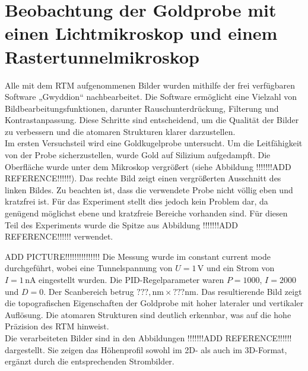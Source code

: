 \chapter{Beobachtung der Goldprobe mit einen Lichtmikroskop und einem Rastertunnelmikroskop}
Alle mit dem RTM aufgenommenen Bilder wurden mithilfe der frei verfügbaren Software „Gwyddion“ nachbearbeitet.
Die Software ermöglicht eine Vielzahl von Bildbearbeitungsfunktionen, darunter Rauschunterdrückung, Filterung und Kontrastanpassung. Diese Schritte sind entscheidend, um die Qualität der Bilder zu verbessern und die atomaren Strukturen klarer darzustellen.\\
Im ersten Versuchsteil wird eine Goldkugelprobe untersucht. Um die Leitfähigkeit von der Probe sicherzustellen, wurde Gold auf Silizium aufgedampft. Die Oberfläche wurde unter dem Mikroskop vergrößert (siehe Abbildung !!!!!!!ADD REFERENCE!!!!!!). 
Das rechte Bild zeigt einen vergrößerten Ausschnitt des linken Bildes. Zu beachten ist, dass die verwendete Probe nicht völlig eben und kratzfrei ist. Für das Experiment stellt dies jedoch kein Problem dar, da genügend möglichst ebene und kratzfreie Bereiche vorhanden sind. Für diesen Teil des Experiments wurde die Spitze aus Abbildung !!!!!!!ADD REFERENCE!!!!!! verwendet.

 ADD PICTURE!!!!!!!!!!!!!!!
Die Messung wurde im constant current mode durchgeführt, wobei eine Tunnelspannung von $U = 1\,\text{V}$ und ein Strom von $I = 1\,\text{nA}$ eingestellt wurden. Die PID-Regelparameter waren $P = 1000$, $I = 2000$ und $D = 0$. Der Scanbereich betrug $???,\text{nm} \times ???\text{nm}$. Das resultierende Bild zeigt die topografischen Eigenschaften der Goldprobe mit hoher lateraler und vertikaler Auflösung. Die atomaren Strukturen sind deutlich erkennbar, was auf die hohe Präzision des RTM hinweist.\\

Die verarbeiteten Bilder sind in den Abbildungen !!!!!!!ADD REFERENCE!!!!!! dargestellt. Sie zeigen das Höhenprofil sowohl im 2D- als auch im 3D-Format, ergänzt durch die entsprechenden Strombilder.

